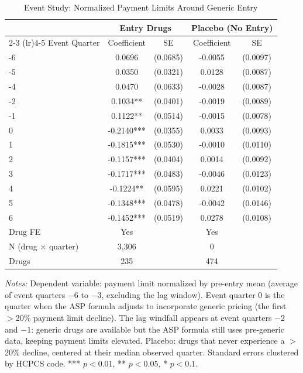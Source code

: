 \begin{table}[ht]
\centering
\begin{threeparttable}
\caption{Event Study: Normalized Payment Limits Around Generic Entry}
\label{tab:event_study}
\begin{tabular}{lcccc}
\toprule
 & \multicolumn{2}{c}{Entry Drugs} & \multicolumn{2}{c}{Placebo (No Entry)} \\
\cmidrule(lr){2-3} \cmidrule(lr){4-5}
Event Quarter & Coefficient & SE & Coefficient & SE \\
\midrule
-6 & 0.0696 & (0.0685) & -0.0055 & (0.0097) \\
-5 & 0.0350 & (0.0321) & 0.0128 & (0.0087) \\
-4 & 0.0470 & (0.0633) & -0.0028 & (0.0087) \\
-2 & 0.1034** & (0.0401) & -0.0019 & (0.0089) \\
-1 & 0.1122** & (0.0514) & -0.0015 & (0.0078) \\
0 & -0.2140*** & (0.0355) & 0.0033 & (0.0093) \\
1 & -0.1815*** & (0.0530) & -0.0010 & (0.0110) \\
2 & -0.1157*** & (0.0404) & 0.0014 & (0.0092) \\
3 & -0.1717*** & (0.0483) & -0.0046 & (0.0123) \\
4 & -0.1224** & (0.0595) & 0.0221 & (0.0102) \\
5 & -0.1348*** & (0.0478) & -0.0042 & (0.0146) \\
6 & -0.1452*** & (0.0519) & 0.0278 & (0.0108) \\
\midrule
Drug FE & Yes & & Yes & \\
N (drug $\times$ quarter) & 3,306 & & 0 & \\
Drugs & 235 & & 474 & \\
\bottomrule
\end{tabular}
\begin{tablenotes}[flushleft]\footnotesize
\item \textit{Notes:} Dependent variable: payment limit normalized by pre-entry mean (average of event quarters $-6$ to $-3$, excluding the lag window). Event quarter 0 is the quarter when the ASP formula adjusts to incorporate generic pricing (the first $>$20\% payment limit decline). The lag windfall appears at event quarters $-2$ and $-1$: generic drugs are available but the ASP formula still uses pre-generic data, keeping payment limits elevated. Placebo: drugs that never experience a $>$20\% decline, centered at their median observed quarter. Standard errors clustered by HCPCS code. *** $p<0.01$, ** $p<0.05$, * $p<0.1$.
\end{tablenotes}
\end{threeparttable}
\end{table}

